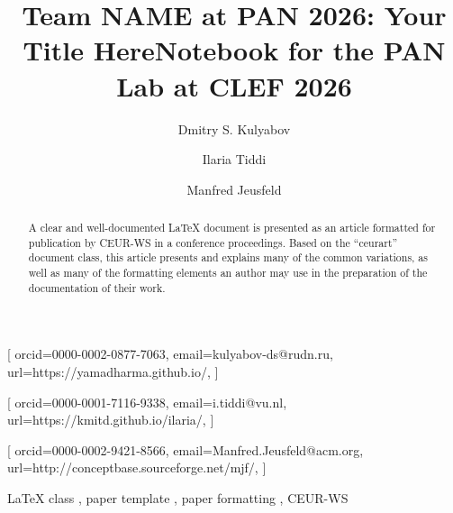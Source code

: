 \documentclass[]{ceurart}
\begin{document}


\title{Team NAME at PAN 2026: Your Title Here}
\title[mode=sub]{Notebook for the PAN Lab at CLEF 2026}

\author[1,2]{Dmitry S. Kulyabov}[%
orcid=0000-0002-0877-7063,
email=kulyabov-ds@rudn.ru,
url=https://yamadharma.github.io/,
]
\cormark[1]
\fnmark[1]
\address[1]{Peoples' Friendship University of Russia (RUDN University),
  6 Miklukho-Maklaya St, Moscow, 117198, Russian Federation}
\address[2]{Joint Institute for Nuclear Research,
  6 Joliot-Curie, Dubna, Moscow region, 141980, Russian Federation}

\author[3]{Ilaria Tiddi}[%
orcid=0000-0001-7116-9338,
email=i.tiddi@vu.nl,
url=https://kmitd.github.io/ilaria/,
]
\fnmark[1]
\address[3]{Vrije Universiteit Amsterdam, De Boelelaan 1105, 1081 HV Amsterdam, The Netherlands}

\author[4]{Manfred Jeusfeld}[%
orcid=0000-0002-9421-8566,
email=Manfred.Jeusfeld@acm.org,
url=http://conceptbase.sourceforge.net/mjf/,
]
\fnmark[1]
\address[4]{University of Skövde, Högskolevägen 1, 541 28 Skövde, Sweden}


\begin{abstract}
  A clear and well-documented \LaTeX{} document is presented as an
  article formatted for publication by CEUR-WS in a conference
  proceedings. Based on the ``ceurart'' document class, this article
  presents and explains many of the common variations, as well as many
  of the formatting elements an author may use in the preparation of
  the documentation of their work.
\end{abstract}

\begin{keywords}
  LaTeX class \sep
  paper template \sep
  paper formatting \sep
  CEUR-WS
\end{keywords}
\end{document}
